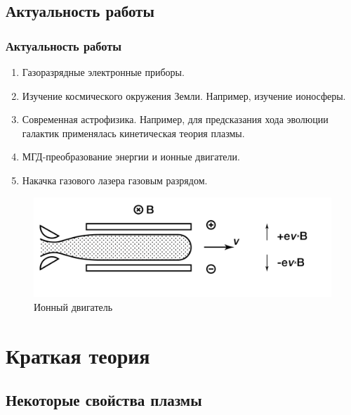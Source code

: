 \documentclass[10pt,pdf,hyperref={unicode}, dvipsnames]{beamer}
\begin{document}
\subsection{Актуальность работы}
\begin{frame}[t]

	
	\frametitle{Актуальность работы}
		\vfill
		\begin{enumerate}
			\item Газоразрядные электронные приборы.
			\item Изучение космического окружения Земли. Например, изучение ионосферы.
			\item Современная астрофизика. Например, для предсказания хода эволюции галактик применялась кинетическая теория плазмы.
			\item МГД-преобразование энергии и ионные двигатели.

			\item Накачка газового лазера газовым разрядом.
		\end{enumerate}
			\begin{figure}[tb]
				\centering
				\includegraphics[width=0.8\linewidth]{fig/mgd}
				\caption*{Ионный двигатель}
				\label{fig:mgd}
			\end{figure}

\end{frame}

\section{Краткая теория}
\subsection{Некоторые свойства плазмы}

\end{document}
